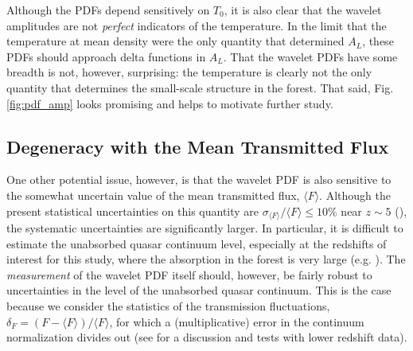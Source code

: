 Although the PDFs depend sensitively
on $T_0$, it is also clear that the wavelet amplitudes are not {\em perfect} indicators of the temperature. In the limit
that the temperature at mean density were the only quantity that determined $A_L$, these PDFs should approach delta functions
in $A_L$.
That the wavelet PDFs have some breadth is not, however, surprising: the temperature is clearly not the only quantity that
determines the small-scale structure in the forest. That said, Fig. \ref{fig:pdf_amp} looks promising and helps to motivate
further study.


\subsection{Degeneracy with the Mean Transmitted Flux}
\label{sec:IGMTempdegen_amf}

One other potential issue, however, is that the wavelet PDF is also sensitive to the somewhat uncertain value of the mean transmitted 
flux, $\langle F \rangle$. Although the present statistical uncertainties on this quantity are $\sigma_{\langle F \rangle}/\langle F \rangle \leq 10\%$ near $z \sim 5$ (\citealt{Becker:2012aq}), the systematic uncertainties are significantly larger. In particular, it is difficult
to estimate the unabsorbed quasar continuum level, especially at the redshifts of interest for this study, where the
absorption in the forest is very large (e.g. \citealt{2008ApJ...681..831F}). The {\em measurement} of the wavelet PDF itself should, however,
be fairly robust to uncertainties in the level of the unabsorbed quasar continuum. This is the case because we consider the statistics
of the transmission fluctuations, $\delta_F = (F - \langle F \rangle)/\langle F \rangle$, for which a (multiplicative) error in the continuum normalization
divides out (see \citet{Lidz:2009ca} for a discussion and tests with lower redshift data).


